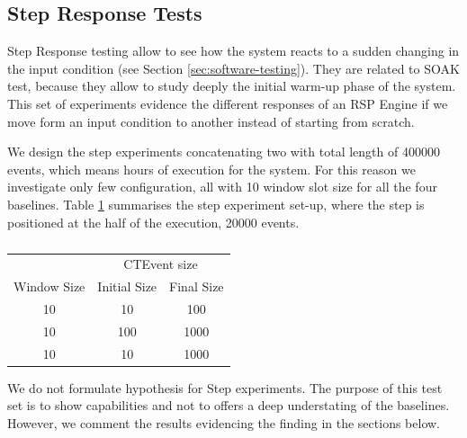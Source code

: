 
\subsection{Step Response Tests}\label{sec:step-es}

Step Response testing allow to see how the system reacts to a sudden changing in the input condition (see Section \ref{sec:software-testing}). They are related to SOAK test, because they allow to study deeply the initial warm-up phase of the system. This set of experiments evidence the different responses of an RSP Engine if we move form an input condition to another instead of starting from scratch.

We design the step experiments concatenating two with total length of 400000 events, which means hours of execution for the system. For this reason we investigate only few configuration, all with 10  window slot size for all the four baselines. Table \ref{tab:steptests} summarises the step experiment set-up, where the step is positioned at the half of the execution, 20000 events.
\begin{table}[htb]
\centering
 \begin{tabular}{c|c|c}
	  	\hline
	  	&\multicolumn{2}{c}{CTEvent size}  \\
		Window Size & Initial Size & Final Size\\
		\hline
		\hline
		 10 & 10 & 100\\
		  10 & 100 & 1000\\
		 10 & 10 & 1000\\
		\hline 
 \end{tabular}
 \caption{}
\label{tab:steptests}
\end{table}

We do not formulate hypothesis for Step experiments. The purpose of this test set is to show \name capabilities and not to offers a deep understating of the baselines. However, we comment the results evidencing the finding in the sections below.

